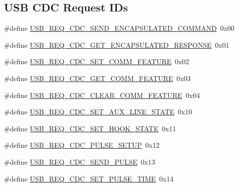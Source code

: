 \subsection*{\-U\-S\-B \-C\-D\-C \-Request \-I\-Ds}
\begin{DoxyCompactItemize}
\item 
\#define \hyperlink{group__cdc__protocol__group_gac9488d02fd62ae9c3cbaea21a92ab06c}{\-U\-S\-B\-\_\-\-R\-E\-Q\-\_\-\-C\-D\-C\-\_\-\-S\-E\-N\-D\-\_\-\-E\-N\-C\-A\-P\-S\-U\-L\-A\-T\-E\-D\-\_\-\-C\-O\-M\-M\-A\-N\-D}~0x00
\item 
\#define \hyperlink{group__cdc__protocol__group_gaea0db4450686edfe7f5ecbd7772db08c}{\-U\-S\-B\-\_\-\-R\-E\-Q\-\_\-\-C\-D\-C\-\_\-\-G\-E\-T\-\_\-\-E\-N\-C\-A\-P\-S\-U\-L\-A\-T\-E\-D\-\_\-\-R\-E\-S\-P\-O\-N\-S\-E}~0x01
\item 
\#define \hyperlink{group__cdc__protocol__group_ga84c2ea5b5542b229be667ba6ad81d97f}{\-U\-S\-B\-\_\-\-R\-E\-Q\-\_\-\-C\-D\-C\-\_\-\-S\-E\-T\-\_\-\-C\-O\-M\-M\-\_\-\-F\-E\-A\-T\-U\-R\-E}~0x02
\item 
\#define \hyperlink{group__cdc__protocol__group_gaf04ea09f95ab7fb012462f7679c126d4}{\-U\-S\-B\-\_\-\-R\-E\-Q\-\_\-\-C\-D\-C\-\_\-\-G\-E\-T\-\_\-\-C\-O\-M\-M\-\_\-\-F\-E\-A\-T\-U\-R\-E}~0x03
\item 
\#define \hyperlink{group__cdc__protocol__group_ga85bffa3729c58e2ac4cbec0c3bc0873c}{\-U\-S\-B\-\_\-\-R\-E\-Q\-\_\-\-C\-D\-C\-\_\-\-C\-L\-E\-A\-R\-\_\-\-C\-O\-M\-M\-\_\-\-F\-E\-A\-T\-U\-R\-E}~0x04
\item 
\#define \hyperlink{group__cdc__protocol__group_ga283df094c43680698900ac8fdefb7687}{\-U\-S\-B\-\_\-\-R\-E\-Q\-\_\-\-C\-D\-C\-\_\-\-S\-E\-T\-\_\-\-A\-U\-X\-\_\-\-L\-I\-N\-E\-\_\-\-S\-T\-A\-T\-E}~0x10
\item 
\#define \hyperlink{group__cdc__protocol__group_ga193e50f401d74557e36be10f8be0ddbd}{\-U\-S\-B\-\_\-\-R\-E\-Q\-\_\-\-C\-D\-C\-\_\-\-S\-E\-T\-\_\-\-H\-O\-O\-K\-\_\-\-S\-T\-A\-T\-E}~0x11
\item 
\#define \hyperlink{group__cdc__protocol__group_ga2c303c4a845634355a8f96ac1c965c15}{\-U\-S\-B\-\_\-\-R\-E\-Q\-\_\-\-C\-D\-C\-\_\-\-P\-U\-L\-S\-E\-\_\-\-S\-E\-T\-U\-P}~0x12
\item 
\#define \hyperlink{group__cdc__protocol__group_gace1ba968487e94d8accfa1817b56899a}{\-U\-S\-B\-\_\-\-R\-E\-Q\-\_\-\-C\-D\-C\-\_\-\-S\-E\-N\-D\-\_\-\-P\-U\-L\-S\-E}~0x13
\item 
\#define \hyperlink{group__cdc__protocol__group_gaa95ef54582b5f30d9b343cd1be5b9051}{\-U\-S\-B\-\_\-\-R\-E\-Q\-\_\-\-C\-D\-C\-\_\-\-S\-E\-T\-\_\-\-P\-U\-L\-S\-E\-\_\-\-T\-I\-M\-E}~0x14

\end{DoxyCompactItemize}
